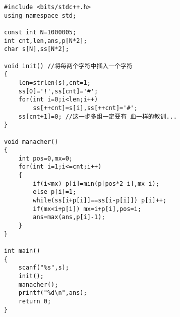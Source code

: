 \begin{lstlisting}
#include <bits/stdc++.h>
using namespace std;

const int N=1000005;
int cnt,len,ans,p[N*2];
char s[N],ss[N*2];

void init() //将每两个字符中插入一个字符
{
    len=strlen(s),cnt=1;
    ss[0]='!',ss[cnt]='#';
    for(int i=0;i<len;i++)
        ss[++cnt]=s[i],ss[++cnt]='#';
	ss[cnt+1]=0; //这一步多组一定要有 血一样的教训...
}

void manacher()
{
    int pos=0,mx=0;
    for(int i=1;i<=cnt;i++)
    {
        if(i<mx) p[i]=min(p[pos*2-i],mx-i);
        else p[i]=1;
        while(ss[i+p[i]]==ss[i-p[i]]) p[i]++;
        if(mx<i+p[i]) mx=i+p[i],pos=i;
        ans=max(ans,p[i]-1);
    }
}

int main()
{
    scanf("%s",s);
    init();
    manacher();
    printf("%d\n",ans);
    return 0;
}
\end{lstlisting}